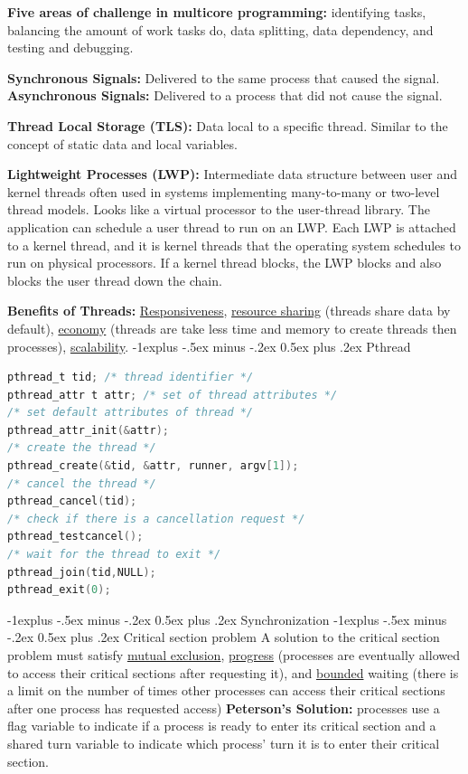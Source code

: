 \documentclass[letterpaper, 8pt]{extarticle}
\makeatletter
\renewcommand{\section}{\@startsection{section}{1}{0mm}%
                                {-1explus -.5ex minus -.2ex}%
                                {0.5ex plus .2ex}%
                                {\normalfont\normalsize\bfseries}}
\renewcommand{\subsection}{\@startsection{subsection}{2}{0mm}%
                                {-1explus -.5ex minus -.2ex}%
                                {0.5ex plus .2ex}%
                                {\normalfont\small\bfseries}}
\makeatother
\begin{document}
\begin{multicols*}{6}
    \textbf{Five areas of challenge in multicore programming:} identifying tasks,
    balancing the amount of work tasks do, data splitting, data dependency,
    and testing and debugging.

    \textbf{Synchronous Signals:} Delivered to the same process that caused the
    signal.
    \textbf{Asynchronous Signals:} Delivered to a process that did not cause the
    signal.

    \textbf{Thread Local Storage (TLS):} Data local to a specific thread. Similar
    to the concept of static data and local variables.

    \textbf{Lightweight Processes (LWP):} Intermediate data structure between
    user and kernel threads often used in systems implementing many-to-many or
    two-level thread models. Looks like a virtual processor to the user-thread
    library. The application can schedule a user thread to
    run on an LWP. Each LWP is attached to a kernel thread, and it is kernel
    threads that the operating system schedules to run on physical processors.
    If a kernel thread blocks, the LWP blocks and also blocks the user thread
    down the chain.

    \textbf{Benefits of Threads:} \underline{Responsiveness},
    \underline{resource sharing} (threads share data by default),
    \underline{economy} (threads are take less time and memory to create
    threads then processes), \underline{scalability}.
    \subsection{Pthread}
    \begin{lstlisting}[language=C]
pthread_t tid; /* thread identifier */
pthread_attr t attr; /* set of thread attributes */
/* set default attributes of thread */
pthread_attr_init(&attr);
/* create the thread */
pthread_create(&tid, &attr, runner, argv[1]);
/* cancel the thread */
pthread_cancel(tid);
/* check if there is a cancellation request */
pthread_testcancel();
/* wait for the thread to exit */
pthread_join(tid,NULL);
pthread_exit(0);
\end{lstlisting}
    \section{Synchronization}
    \subsection{Critical section problem}
    A solution to the critical section problem must satisfy
    \underline{mutual exclusion},
    \underline{progress} (processes are eventually allowed to access their
    critical sections after requesting it), and
    \underline{bounded} waiting (there is a limit
    on the number of times other processes can access their critical sections
    after one process has requested access)
    \textbf{Peterson's Solution:} processes use a flag variable to indicate
    if a process is ready to enter its critical section and a shared
    turn variable to indicate which process' turn it is to enter their
    critical section.



\end{multicols*}
\end{document}
